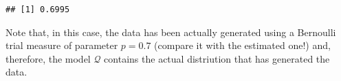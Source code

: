 \begin{example}
\begin{knitrout}
\color{fgcolor}\begin{kframe}
\begin{alltt}
\end{alltt}
\begin{verbatim}
## [1] 0.6995
\end{verbatim}
\begin{alltt}
\end{alltt}
\end{kframe}
\end{knitrout}
Note that, in this case, the data has been actually generated using a Bernoulli trial measure of parameter $p = 0.7$ (compare it with the estimated one!) and, therefore, the model $\mathcal Q$ contains the actual distriution that has generated the data. 
	\end{example}

